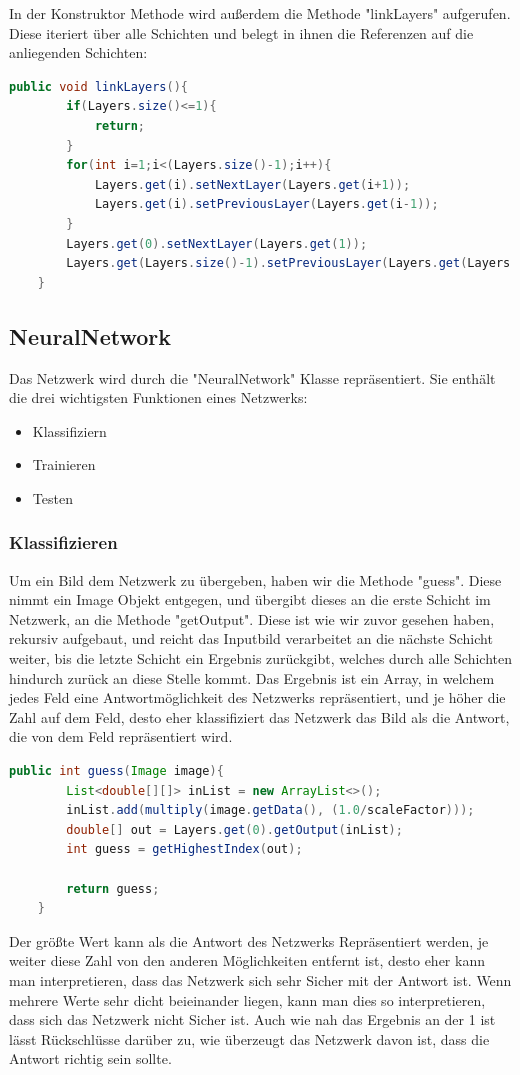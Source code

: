 \documentclass[12pt]{article}
\begin{document}
In der Konstruktor Methode wird außerdem die Methode "linkLayers" aufgerufen. Diese iteriert über alle Schichten und belegt in ihnen die Referenzen auf die anliegenden Schichten:
\begin{lstlisting}[language=Java]
    public void linkLayers(){
        if(Layers.size()<=1){
            return;
        }
        for(int i=1;i<(Layers.size()-1);i++){
            Layers.get(i).setNextLayer(Layers.get(i+1));
            Layers.get(i).setPreviousLayer(Layers.get(i-1));
        }
        Layers.get(0).setNextLayer(Layers.get(1));
        Layers.get(Layers.size()-1).setPreviousLayer(Layers.get(Layers.size()-2));
    }
\end{lstlisting}

\subsection{NeuralNetwork}
Das Netzwerk wird durch die "NeuralNetwork" Klasse repräsentiert. Sie enthält die drei wichtigsten Funktionen eines Netzwerks:
\begin{itemize}
  \item Klassifiziern
  \item Trainieren
  \item Testen
\end{itemize}

\subsubsection{Klassifizieren}

Um ein Bild dem Netzwerk zu übergeben, haben wir die Methode "guess". Diese nimmt ein Image Objekt entgegen, und übergibt dieses an die erste Schicht im Netzwerk, an die Methode "getOutput". Diese ist wie wir zuvor gesehen haben, rekursiv aufgebaut, und reicht das Inputbild verarbeitet an die nächste Schicht weiter, bis die letzte Schicht ein Ergebnis zurückgibt, welches durch alle Schichten hindurch zurück an diese Stelle kommt. Das Ergebnis ist ein Array, in welchem jedes Feld eine Antwortmöglichkeit des Netzwerks repräsentiert, und je höher die Zahl auf dem Feld, desto eher klassifiziert das Netzwerk das Bild als die Antwort, die von dem Feld repräsentiert wird.
\begin{lstlisting}[language=Java]
public int guess(Image image){
        List<double[][]> inList = new ArrayList<>();
        inList.add(multiply(image.getData(), (1.0/scaleFactor)));
        double[] out = Layers.get(0).getOutput(inList);
        int guess = getHighestIndex(out);
        
        return guess;
    }
\end{lstlisting}
Der größte Wert kann als die Antwort des Netzwerks Repräsentiert werden, je weiter diese Zahl von den anderen Möglichkeiten entfernt ist, desto eher kann man interpretieren, dass das Netzwerk sich sehr Sicher mit der Antwort ist. Wenn mehrere Werte sehr dicht beieinander liegen, kann man dies so interpretieren, dass sich das Netzwerk nicht Sicher ist. Auch wie nah das Ergebnis an der 1 ist lässt Rückschlüsse darüber zu, wie überzeugt das Netzwerk davon ist, dass die Antwort richtig sein sollte.
\end{document}

